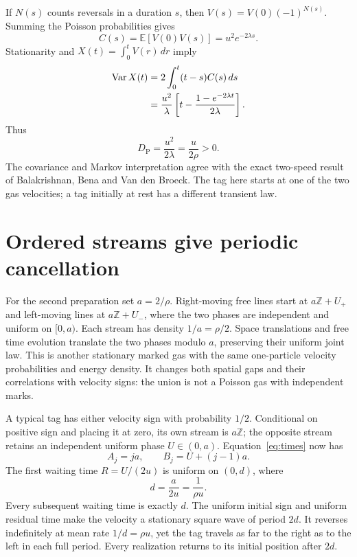 \documentclass[11pt,a4paper]{article}
\newcommand{\Var}{\operatorname{Var}}
\begin{document}
If $N(s)$ counts reversals in a duration $s$, then
$V(s)=V(0)(-1)^{N(s)}$. Summing the Poisson probabilities gives
\begin{equation}
 C(s)=\mathbb E[V(0)V(s)]=u^2e^{-2\lambda s}. \label{eq:cov}
\end{equation}
Stationarity and $X(t)=\int_0^t V(r)\,dr$ imply
\begin{align}
 \Var X(t)&=2\int_0^t(t-s)C(s)\,ds\notag\\
 &=\frac{u^2}{\lambda}\left[t-
 \frac{1-e^{-2\lambda t}}{2\lambda}\right]. \label{eq:poissonvar}
\end{align}
Thus
\begin{equation}
 D_{\mathrm P}=\frac{u^2}{2\lambda}=\frac{u}{2\rho}>0. \label{eq:DP}
\end{equation}
The covariance and Markov interpretation agree with the exact two-speed
result of Balakrishnan, Bena and Van den Broeck.\cite{BalakrishnanBenaVanDenBroeck2002}
The tag here starts at one of the two gas velocities; a tag initially at rest
has a different transient law.

\section{Ordered streams give periodic cancellation}
For the second preparation set $a=2/\rho$. Right-moving free lines start at
$a\mathbb Z+U_+$ and left-moving lines at $a\mathbb Z+U_-$, where the two
phases are independent and uniform on $[0,a)$. Each stream has density
$1/a=\rho/2$. Space translations and free time evolution translate the two
phases modulo $a$, preserving their uniform joint law. This is another
stationary marked gas with the same one-particle velocity probabilities and
energy density. It changes both spatial gaps and their correlations with
velocity signs: the union is not a Poisson gas with independent marks.

A typical tag has either velocity sign with probability $1/2$. Conditional
on positive sign and placing it at zero, its own stream is $a\mathbb Z$;
the opposite stream retains an independent uniform phase $U\in(0,a)$.
Equation~\eqref{eq:times} now has
\begin{equation}
 A_j=ja,\qquad B_j=U+(j-1)a.
\end{equation}
The first waiting time $R=U/(2u)$ is uniform on $(0,d)$, where
\begin{equation}
 d=\frac{a}{2u}=\frac{1}{\rho u}.
\end{equation}
Every subsequent waiting time is exactly $d$. The uniform initial sign and
uniform residual time make the velocity a stationary square wave of period
$2d$. It reverses indefinitely at mean rate $1/d=\rho u$, yet the tag travels
as far to the right as to the left in each full period. Every realization
returns to its initial position after $2d$.
\end{document}
